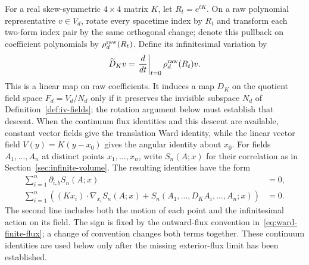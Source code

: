

For a real skew-symmetric $4\times4$ matrix $K$, let $R_t=e^{tK}$. On a raw polynomial representative $v\in V_d$, rotate every spacetime index by $R_t$ and transform each two-form index pair by the same orthogonal change; denote this pullback on coefficient polynomials by $\rho_d^{\rm raw}(R_t)$. Define its infinitesimal variation by
\begin{equation}\label{eq:ward-raw-generator}
 \widetilde D_Kv=\left.\frac{d}{dt}\right|_{t=0}\rho_d^{\rm raw}(R_t)v.
\end{equation}
This is a linear map on raw coefficients. It induces a map $D_K$ on the quotient field space $F_d=V_d/N_d$ only if it preserves the invisible subspace $N_d$ of Definition~\ref{def:iv-fields}; the rotation argument below must establish that descent. When the continuum flux identities and this descent are available, constant vector fields give the translation Ward identity, while the linear vector field $V(y)=K(y-x_0)$ gives the angular identity about $x_0$. For fields $A_1,\ldots,A_n$ at distinct points $x_1,\ldots,x_n$, write $S_n(A;x)$ for their correlation as in Section~\ref{sec:infinite-volume}. The resulting identities have the form
\begin{equation}\label{eq:ward-continuum-identities}
\begin{aligned}
 \sum_{i=1}^n\partial_{i,b}S_n(A;x)&=0,\\
 \sum_{i=1}^n\left((Kx_i)\cdot\nabla_{x_i}S_n(A;x)
       +S_n(A_1,\ldots,D_KA_i,\ldots,A_n;x)\right)&=0.
\end{aligned}
\end{equation}
The second line includes both the motion of each point and the infinitesimal action on its field. The sign is fixed by the outward-flux convention in~\eqref{eq:ward-finite-flux}; a change of convention changes both terms together. These continuum identities are used below only after the missing exterior-flux limit has been established.

